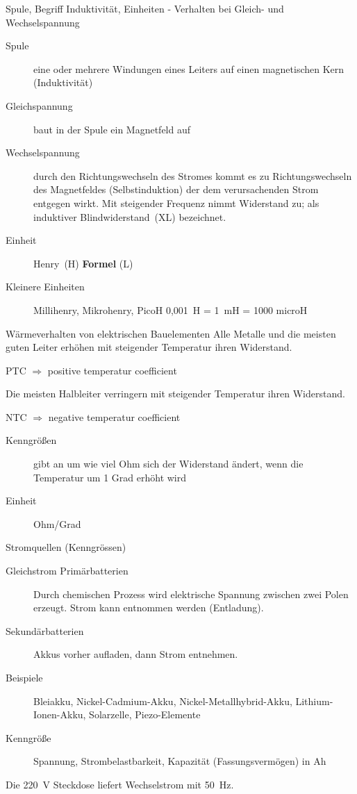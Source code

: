 \documentclass[avery5371,grid,frame,a4paper]{flashcards}
\newcommand{\card}[3]{
  \begin{flashcard}[{\chap} -- #1]{#2}#3\end{flashcard}
}
\begin{document}
\card{04}{Spule, Begriff Induktivität, Einheiten - Verhalten bei Gleich- und Wechselspannung}{
  \footnotesize
  \begin{description}
    \item[Spule] eine oder mehrere Windungen eines Leiters auf einen magnetischen Kern (Induktivität)
    \item[Gleichspannung] baut in der Spule ein Magnetfeld auf
    \item[Wechselspannung] durch den Richtungswechseln des Stromes kommt es zu Richtungswechseln des Magnetfeldes (Selbstinduktion) der dem verursachenden Strom entgegen wirkt.
    Mit steigender Frequenz nimmt Widerstand zu; als induktiver Blindwiderstand~(XL) bezeichnet.
    \item[Einheit] Henry~(H)   \hspace{50pt} \textbf{Formel} (L)
    \item[Kleinere Einheiten] Millihenry, Mikrohenry, PicoH 0,001~H = 1~mH = 1000 microH
  \end{description}
}

\card{05}{Wärmeverhalten von elektrischen Bauelementen}{
  Alle Metalle und die meisten guten Leiter erhöhen mit steigender Temperatur ihren Widerstand.
  \centerline{PTC $\Rightarrow$ positive temperatur coefficient}
  Die meisten Halbleiter verringern mit steigender Temperatur ihren Widerstand.
  \centerline{NTC $\Rightarrow$ negative temperatur coefficient}
  \small
  \begin{description}
    \item[Kenngrößen] gibt an um wie viel Ohm sich der Widerstand ändert, wenn die Temperatur um 1 Grad erhöht wird
    \item[Einheit] Ohm/Grad
  \end{description}
}

\card{06}{Stromquellen (Kenngrössen)}{
  \footnotesize
  \begin{description}
    \item[Gleichstrom Primärbatterien] Durch chemischen Prozess wird elektrische Spannung zwischen zwei Polen erzeugt. Strom kann entnommen werden (Entladung).
    \item[Sekundärbatterien] Akkus vorher aufladen, dann Strom entnehmen.
    \item[Beispiele]
      Bleiakku, Nickel-Cadmium-Akku, Nickel-Metallhybrid-Akku, Lithium-Ionen-Akku,
      Solarzelle, Piezo-Elemente
    \item[Kenngröße] Spannung, Strombelastbarkeit, Kapazität (Fassungsvermögen) in Ah
  \end{description}
  Die 220~V Steckdose liefert Wechselstrom mit 50~Hz.
}
\end{document}
